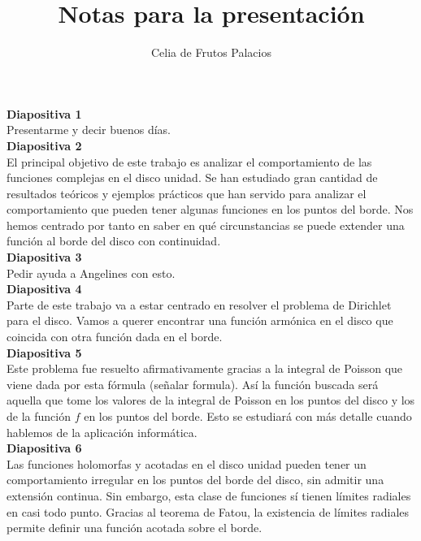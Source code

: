 \documentclass[spanish, a4paper, 12pt]{article}
\begin{document}
\title{Notas para la presentación}
\author{Celia de Frutos Palacios}
\date{}
\maketitle

\textbf{Diapositiva 1} \\

Presentarme y decir buenos días. \\

\textbf{Diapositiva 2} \\

El principal objetivo de este trabajo es analizar el comportamiento de las funciones complejas en el disco unidad. Se han estudiado gran cantidad de resultados teóricos y ejemplos prácticos que han servido para analizar el comportamiento que pueden tener algunas funciones en los puntos del borde. Nos hemos centrado por tanto en saber en qué circunstancias se puede extender una función al borde del disco con continuidad. \\

\textbf{Diapositiva 3} \\

Pedir ayuda a Angelines con esto. \\

\textbf{Diapositiva 4} \\

Parte de este trabajo va a estar centrado en resolver el problema de Dirichlet para el disco. Vamos a querer encontrar una función armónica en el disco que coincida con otra función dada en el borde. \\

\textbf{Diapositiva 5} \\

Este problema fue resuelto afirmativamente gracias a la integral de Poisson que viene dada por esta fórmula (señalar formula). Así la función buscada será aquella que tome los valores de la integral de Poisson en los puntos del disco y los de la función $f$ en los puntos del borde. Esto se estudiará con más detalle cuando hablemos de la aplicación informática. \\

\textbf{Diapositiva 6} \\

Las funciones holomorfas y acotadas en el disco unidad pueden tener un comportamiento irregular en los puntos del borde del disco, sin admitir una extensión continua. Sin embargo, esta clase de funciones sí tienen límites radiales en casi todo punto. Gracias al teorema de Fatou, la existencia de límites radiales permite definir una función acotada sobre el borde. \\
\end{document}
